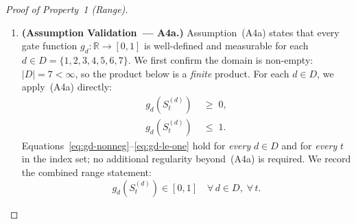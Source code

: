 \documentclass[12pt,openany]{book}
\numberwithin{equation}{chapter}
\theoremstyle{plain}
\theoremstyle{definition}
\theoremstyle{remark}
\def\mathcal#1{#1}%
\begin{document}
\begin{proof}[Proof of Property~1 (Range)]
\begin{enumerate}
  \item \textbf{(Assumption Validation~--- A4a.)}
        Assumption~(A4a) states that every gate function
        $g_d : \mathbb{R} \to [0,1]$ is well-defined and
        measurable for each $d \in \mathcal{D}
        = \{1,2,3,4,5,6,7\}$.
        We first confirm the domain is non-empty:
        $|\mathcal{D}| = 7 < \infty$, so the product below
        is a \emph{finite} product.
        For each $d \in \mathcal{D}$, we apply~(A4a) directly:
        \begin{align}
          g_d\!\left(\mathcal{S}_t^{(d)}\right)
            &\;\geq\; 0,
            \label{eq:gd-nonneg} \\
          g_d\!\left(\mathcal{S}_t^{(d)}\right)
            &\;\leq\; 1.
            \label{eq:gd-le-one}
        \end{align}
        Equations~\eqref{eq:gd-nonneg}--\eqref{eq:gd-le-one}
        hold for \emph{every} $d \in \mathcal{D}$ and for
        \emph{every} $t$ in the index set; no additional
        regularity beyond~(A4a) is required.
        We record the combined range statement:
        \begin{equation}
          g_d\!\left(\mathcal{S}_t^{(d)}\right) \in [0,1]
          \quad \forall\, d \in \mathcal{D},\;
          \forall\, t.
          \label{eq:gd-range}
        \end{equation}


\end{enumerate}
\end{proof}
\end{document}
